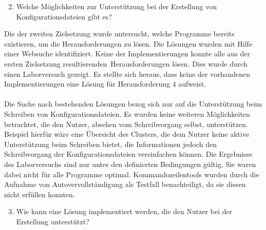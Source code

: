 \begin{enumerate}
  \setcounter{enumi}{1}
  \item Welche Möglichkeiten zur Unterstützung bei der Erstellung von Konfigurationsdateien gibt es?
\end{enumerate}

Die der zweiten Zielsetzung wurde untersucht, welche Programme bereits existieren, um die Herausforderungen zu lösen.
Die Lösungen wurden mit Hilfe einer Websuche identifiziert.
Keine der Implementierungen konnte alle aus der ersten Zielsetzung resultierenden\ Herausforderungen lösen.
Dies wurde durch einen Laborversuch gezeigt.
Es stellte sich heraus, dass keine der vorhandenen Implementierungen eine Lösung für Herausforderung 4 aufweist.
\\\\
Die Suche nach bestehenden Lösungen bezog sich nur auf die Unterstützung beim Schreiben von Konfigurationsdateien.
Es wurden keine weiteren Möglichkeiten betrachtet, die den Nutzer, absehen vom Schreibvorgang selbst, unterstützen.
Beispiel hierfür wäre eine Übersicht des Clusters, die dem Nutzer keine aktive Unterstützung beim Schreiben bietet,
die Informationen jedoch den Schreibvorgang der Konfigurationsdateien vereinfachen können.
Die Ergebnisse des Laborversuchs sind nur unter den definierten Bedingungen gültig.
Sie waren dabei nicht für alle Programme optimal. Kommandozeilentools wurden durch die Aufnahme von Autovervollständigung als Testfall benachteiligt,
da sie diesen nicht erfüllen konnten.

\begin{enumerate}
  \setcounter{enumi}{2}
  \item Wie kann eine Lösung implementiert werden, die den Nutzer bei der Erstellung unterstützt?
\end{enumerate}

